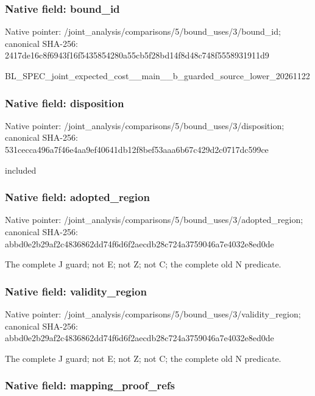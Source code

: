\documentclass[10pt,a4paper]{article}
\begin{document}
\subsubsection{Native field: bound\_id}


Native pointer: /joint\_analysis/comparis\allowbreak{}ons/5/bound\_uses/3/bound\allowbreak{}\_id; canonical SHA-256: 2417de16c8f6943f16f54358\allowbreak{}54280a55cb5f28bd14f8d48c\allowbreak{}748f5558931911d9


BL\_SPEC\_joint\_expected\_c\allowbreak{}ost\_\_main\_\_b\_guarded\_sou\allowbreak{}rce\_lower\_20261122


\subsubsection{Native field: disposition}


Native pointer: /joint\_analysis/comparis\allowbreak{}ons/5/bound\_uses/3/dispo\allowbreak{}sition; canonical SHA-256: 531cecca496a7f46e4aa9ef4\allowbreak{}0641db12f8bef53aaa6b67c4\allowbreak{}29d2c0717dc599ce


included


\subsubsection{Native field: adopted\_region}


Native pointer: /joint\_analysis/comparis\allowbreak{}ons/5/bound\_uses/3/adopt\allowbreak{}ed\_region; canonical SHA-256: abbd0e2b29af2c4836862dd7\allowbreak{}4f6d6f2aecdb28c724a37590\allowbreak{}46a7e4032e8ed0de


The complete J guard; not E; not Z; not C; the complete old N predicate.


\subsubsection{Native field: validity\_region}


Native pointer: /joint\_analysis/comparis\allowbreak{}ons/5/bound\_uses/3/valid\allowbreak{}ity\_region; canonical SHA-256: abbd0e2b29af2c4836862dd7\allowbreak{}4f6d6f2aecdb28c724a37590\allowbreak{}46a7e4032e8ed0de


The complete J guard; not E; not Z; not C; the complete old N predicate.


\subsubsection{Native field: mapping\_proof\_refs}
\end{document}
